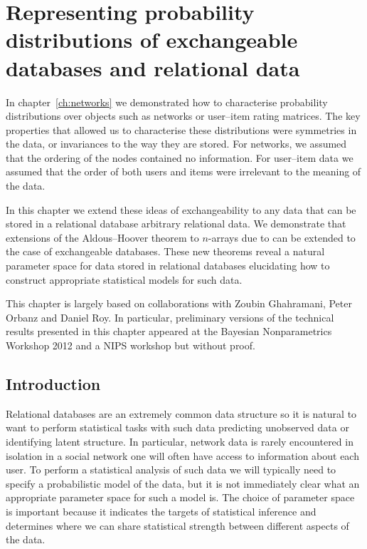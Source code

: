 
\inbpdocument

\chapter{Representing probability distributions of exchangeable databases and relational data}
\label{ch:arrays}

In chapter~\ref{ch:networks} we demonstrated how to characterise probability distributions over objects such as networks or user--item rating matrices.
The key properties that allowed us to characterise these distributions were symmetries in the data, or invariances to the way they are stored.
For networks, we assumed that the ordering of the nodes contained no information.
For user--item data we assumed that the order of both users and items were irrelevant to the meaning of the data.

In this chapter we extend these ideas of exchangeability to any data that can be stored in a relational database \ie arbitrary relational data.
We demonstrate that extensions of the Aldous--Hoover theorem to $n$-arrays due to \citet{Kallenberg1999-pj} can be extended to the case of exchangeable databases.
These new theorems reveal a natural parameter space for data stored in relational databases elucidating how to construct appropriate statistical models for such data.

This chapter is largely based on collaborations with Zoubin Ghahramani, Peter Orbanz and Daniel Roy.
In particular, preliminary versions of the technical results presented in this chapter appeared at the Bayesian Nonparametrics Workshop 2012 and a NIPS workshop \citep{Lloyd_undated-iu} but without proof.

\section{Introduction}

Relational databases are an extremely common data structure so it is natural to want to perform statistical tasks with such data \eg predicting unobserved data or identifying latent structure.
In particular, network data is rarely encountered in isolation \eg in a social network one will often have access to information about each user.
To perform a statistical analysis of such data we will typically need to specify a probabilistic model of the data, but it is not immediately clear what an appropriate parameter space for such a model is.
The choice of parameter space is important because it indicates the targets of statistical inference and determines where we can share statistical strength between different aspects of the data.

